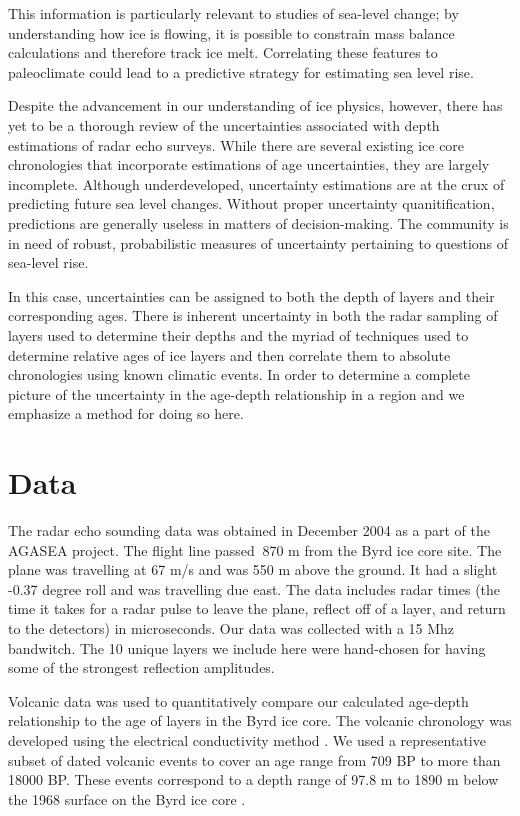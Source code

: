 \documentclass[draft,jgrga]{agutex}
\begin{document}
This information is particularly relevant to studies of sea-level
change; by understanding how ice is flowing, it is possible to
constrain mass balance calculations and therefore track ice
melt. Correlating these features to paleoclimate could lead to a
predictive strategy for estimating sea level rise.

Despite the advancement in our understanding of ice physics, however,
there has yet to be a thorough review of the uncertainties associated
with depth estimations of radar echo surveys. While there are several
existing ice core chronologies that incorporate estimations of age
uncertainties, they are largely incomplete. Although underdeveloped,
uncertainty estimations are at the crux of predicting future sea level 
changes. Without proper uncertainty quanitification, predictions are 
generally useless in matters of decision-making. The community is in
need of robust, probabilistic measures of uncertainty pertaining to
questions of sea-level rise.
 
In this case, uncertainties can be assigned to both the depth of
layers and their corresponding ages. There is inherent uncertainty in
both the radar sampling of layers used to determine their depths and
the myriad of techniques used to determine relative ages of ice layers
and then correlate them to absolute chronologies using known climatic
events. In order to determine a complete picture of the uncertainty
in the age-depth relationship in a region and we emphasize a method
for doing so here.


\section{Data}

The radar echo sounding data was obtained in December 2004 as a part
of the AGASEA project. The flight line passed $~$870 m from the Byrd
ice core site. The plane was travelling at 67 m/s and was 550 m above the
ground. It had a slight -0.37 degree roll and was travelling due
east. The data includes radar times (the time it takes for a radar
pulse to leave the plane, reflect off of a layer, and return to the
detectors) in microseconds. Our data was collected with a 15 Mhz
bandwitch. The 10 unique layers we include here were
hand-chosen for having some of the strongest reflection amplitudes.

Volcanic data was used to quantitatively compare our calculated
age-depth relationship to the age of layers in the Byrd ice core. The
volcanic chronology was developed using the electrical conductivity
method \citet{Hammer94}. We used a representative subset of dated
volcanic events to cover an age range from 709 BP to more than 18000 BP. 
These events correspond to a depth range of 97.8 m to 1890 m below the
1968 surface on the Byrd ice core \citet{Gow68}.
\end{document}
